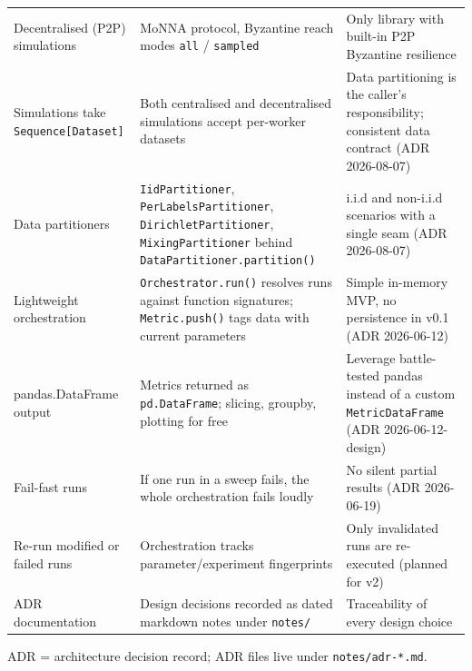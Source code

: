 \documentclass[twoside,11pt]{article}
\begin{document}
{\begin{center}
\begin{tabular}{>{\raggedright\arraybackslash}p{3.2cm} >{\raggedright\arraybackslash}p{5.6cm} >{\raggedright\arraybackslash}p{4.8cm}}
    Decentralised (P2P) simulations & MoNNA protocol, Byzantine reach modes \texttt{all} / \texttt{sampled} & Only library with built-in P2P Byzantine resilience \\
    Simulations take \texttt{Sequence[Dataset]} & Both centralised and decentralised simulations accept per-worker datasets & Data partitioning is the caller's responsibility; consistent data contract (ADR 2026-08-07) \\
    Data partitioners & \texttt{IidPartitioner}, \texttt{PerLabelsPartitioner}, \texttt{DirichletPartitioner}, \texttt{MixingPartitioner} behind \texttt{DataPartitioner.partition()} & i.i.d and non-i.i.d scenarios with a single seam (ADR 2026-08-07) \\
    Lightweight orchestration & \texttt{Orchestrator.run()} resolves runs against function signatures; \texttt{Metric.push()} tags data with current parameters & Simple in-memory MVP, no persistence in v0.1 (ADR 2026-06-12) \\
    pandas.DataFrame output & Metrics returned as \texttt{pd.DataFrame}; slicing, groupby, plotting for free & Leverage battle-tested pandas instead of a custom \texttt{MetricDataFrame} (ADR 2026-06-12-design) \\
    Fail-fast runs & If one run in a sweep fails, the whole orchestration fails loudly & No silent partial results (ADR 2026-06-19) \\
    Re-run modified or failed runs & Orchestration tracks parameter/experiment fingerprints & Only invalidated runs are re-executed (planned for v2) \\
    ADR documentation & Design decisions recorded as dated markdown notes under \texttt{notes/} & Traceability of every design choice \\
    \bottomrule
\end{tabular}
\end{center}
\footnotesize ADR = architecture decision record; ADR files live under \texttt{notes/adr-*.md}.
}
\end{document}
